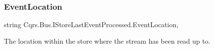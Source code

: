 \subsubsection{\texorpdfstring{Event\+Location}{EventLocation}}
{\footnotesize\ttfamily string Cqrs.\+Bus.\+I\+Store\+Last\+Event\+Processed.\+Event\+Location\hspace{0.3cm}{\ttfamily [get]}, {\ttfamily [set]}}



The location within the store where the stream has been read up to. 

